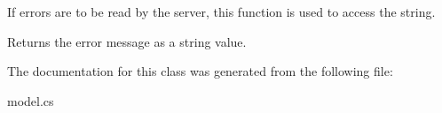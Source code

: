 If errors are to be read by the server, this function is used to access the string. 

\begin{DoxyReturn}{Returns}
the error message as a string value. 
\end{DoxyReturn}


The documentation for this class was generated from the following file\+:\begin{DoxyCompactItemize}
\item 
model.\+cs\end{DoxyCompactItemize}
